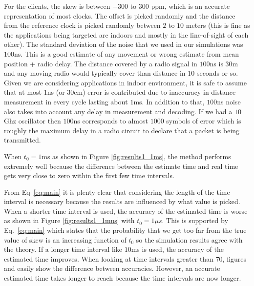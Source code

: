 \documentclass[10pt, journal, letter, onecolumn]{IEEEtran}
\begin{document}
For the clients, the skew is between $-300$ to $300$ ppm, which is an accurate representation of most clocks. The offset is picked randomly and the distance from the reference clock is picked randomly between $2$ to $10$ meters (this is fine as the applications being targeted are indoors and mostly in the line-of-sight of each other).
The standard deviation of the noise that we used in our simulations was $100$ns. This is a good estimate of any movement or wrong estimate from mean position + radio delay. The distance covered by a radio signal in $100$ns is $30$m and any moving radio would typically cover than distance in $10$ seconds or so. Given we are considering applications in indoor environment, it is safe to assume that at most $1$ns (or $30$cm) error is contributed due to inaccuracy in distance measurement in every cycle lasting about $1$ms. In addition to that, $100$ns noise also takes into account any delay in measurement and decoding. If we had a $10$Ghz oscillator then $100$ns corresponds to almost $1000$ symbols of error which is roughly the maximum delay in a radio circuit to declare that a packet is being transmitted.

When $t_0 = 1$ms as shown in Figure \ref{fig:results1_1ms}, the method performs extremely well because the difference between the estimate time and real time gets very close to zero within the first few time intervals.

From Eq~\eqref{eq:main} it is plenty clear that considering the length of the time interval is necessary because the results are influenced by what value is picked. When a shorter time interval is used, the accuracy of the estimated time is worse as shown in Figure \ref{fig:results1_1mus} with $t_0 = 1 \mu s$. This is supported by Eq.~\eqref{eq:main} which states that the probability that we get too far from the true value of skew is an increasing function of $t_0$ so the simulation results agree with the theory.
If a longer time interval like $10$ms is used, the accuracy of the estimated time improves. When looking at time intervals greater than 70, figures \label{fig:results2_1ms} and \label{fig:results2_10ms} easily show the difference between accuracies. However, an accurate estimated time takes longer to reach because the time intervals are now longer.
\end{document}
